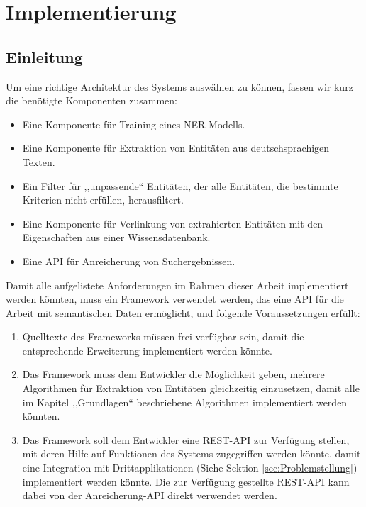 \chapter{Implementierung}
\label{sec:Implementierung}

\section{Einleitung}
Um eine richtige Architektur des Systems auswählen zu können, fassen wir kurz die benötigte Komponenten zusammen:
\begin{itemize}
\item Eine Komponente für Training eines NER-Modells.
\item Eine Komponente für Extraktion von Entitäten aus deutschsprachigen Texten.
\item Ein Filter für ,,unpassende`` Entitäten, der alle Entitäten, die bestimmte Kriterien nicht erfüllen, herausfiltert.
\item Eine Komponente für Verlinkung von extrahierten Entitäten mit den Eigenschaften aus einer Wissensdatenbank.
\item Eine API für Anreicherung von Suchergebnissen.
\end{itemize}

Damit alle aufgelistete Anforderungen im Rahmen dieser Arbeit implementiert werden könnten, muss ein Framework verwendet werden, das eine API für die Arbeit mit semantischen Daten ermöglicht, und folgende Voraussetzungen erfüllt:
\begin{enumerate}
\item Quelltexte des Frameworks müssen frei verfügbar sein, damit die entsprechende Erweiterung implementiert werden könnte.
\item Das Framework muss dem Entwickler die Möglichkeit geben, mehrere Algorithmen für Extraktion von Entitäten gleichzeitig einzusetzen, damit alle im Kapitel ,,Grundlagen`` beschriebene Algorithmen implementiert werden könnten.
\item Das Framework soll dem Entwickler eine REST-API zur Verfügung stellen, mit deren Hilfe auf Funktionen des Systems zugegriffen werden könnte, damit eine Integration mit Drittapplikationen (Siehe Sektion \ref{sec:Problemstellung}) implementiert werden könnte. Die zur Verfügung gestellte REST-API kann dabei von der Anreicherung-API direkt verwendet werden.
\end{enumerate}

